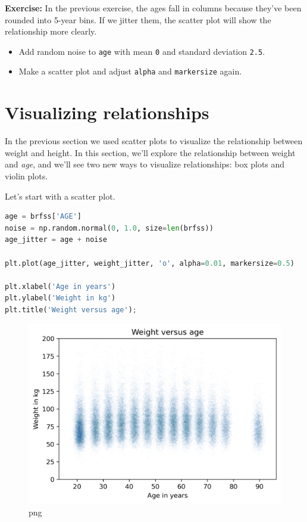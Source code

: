 \documentclass[
]{book}
\newcommand{\passthrough}[1]{#1}
\providecommand{\tightlist}{%
  \setlength{\itemsep}{0pt}\setlength{\parskip}{0pt}}
\begin{document}
\textbf{Exercise:} In the previous exercise, the ages fall in columns
because they've been rounded into 5-year bins. If we jitter them, the
scatter plot will show the relationship more clearly.

\begin{itemize}
\tightlist
\item
  Add random noise to \passthrough{\lstinline!age!} with mean
  \passthrough{\lstinline!0!} and standard deviation
  \passthrough{\lstinline!2.5!}.
\item
  Make a scatter plot and adjust \passthrough{\lstinline!alpha!} and
  \passthrough{\lstinline!markersize!} again.
\end{itemize}

\section{Visualizing relationships}\label{visualizing-relationships}

In the previous section we used scatter plots to visualize the
relationship between weight and height. In this section, we'll explore
the relationship between weight and \emph{age}, and we'll see two new
ways to visualize relationships: box plots and violin plots.

Let's start with a scatter plot.

\begin{lstlisting}[language=Python]
age = brfss['AGE']
noise = np.random.normal(0, 1.0, size=len(brfss))
age_jitter = age + noise

plt.plot(age_jitter, weight_jitter, 'o', alpha=0.01, markersize=0.5)

plt.xlabel('Age in years')
plt.ylabel('Weight in kg')
plt.title('Weight versus age');
\end{lstlisting}

\begin{figure}
\centering
\includegraphics{09_relationships_files/09_relationships_39_0.png}
\caption{png}
\end{figure}
\end{document}
